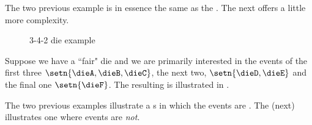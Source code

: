 The two previous  example  is in essence the same as the 
 .
The next offers a little more complexity.
\begin{figure}[h]%
  \centering
  \caption{3-4-2 die example  \label{fig:die_342}}
\end{figure}
\begin{example}
\label{ex:die_342}
Suppose we have a ``fair" die and we are primarily interested in the
events of the first three $\setn{\dieA,\dieB,\dieC}$, the next two, $\setn{\dieD,\dieE}$ and the final one $\setn{\dieF}$.
The resulting  is illustrated in .
\end{example}

The two previous examples  illustrate a
s in which the events %
are . The (next) illustrates one where events are {\em not}.

